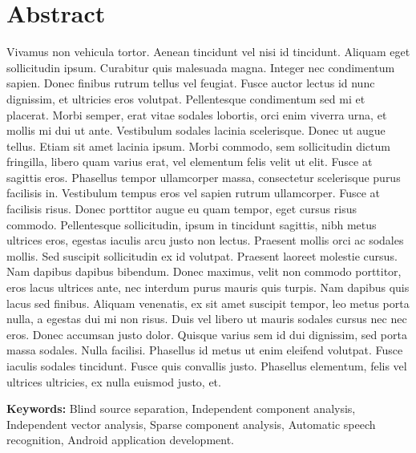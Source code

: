 
\chapter*{Abstract} 

Vivamus non vehicula tortor. Aenean tincidunt vel nisi id tincidunt. Aliquam eget sollicitudin ipsum. Curabitur quis malesuada magna. Integer nec condimentum sapien. Donec finibus rutrum tellus vel feugiat. Fusce auctor lectus id nunc dignissim, et ultricies eros volutpat. Pellentesque condimentum sed mi et placerat. Morbi semper, erat vitae sodales lobortis, orci enim viverra urna, et mollis mi dui ut ante. Vestibulum sodales lacinia scelerisque. Donec ut augue tellus. Etiam sit amet lacinia ipsum. Morbi commodo, sem sollicitudin dictum fringilla, libero quam varius erat, vel elementum felis velit ut elit. Fusce at sagittis eros. Phasellus tempor ullamcorper massa, consectetur scelerisque purus facilisis in. Vestibulum tempus eros vel sapien rutrum ullamcorper. Fusce at facilisis risus. Donec porttitor augue eu quam tempor, eget cursus risus commodo. Pellentesque sollicitudin, ipsum in tincidunt sagittis, nibh metus ultrices eros, egestas iaculis arcu justo non lectus. Praesent mollis orci ac sodales mollis. Sed suscipit sollicitudin ex id volutpat. Praesent laoreet molestie cursus. Nam dapibus dapibus bibendum. Donec maximus, velit non commodo porttitor, eros lacus ultrices ante, nec interdum purus mauris quis turpis. Nam dapibus quis lacus sed finibus. Aliquam venenatis, ex sit amet suscipit tempor, leo metus porta nulla, a egestas dui mi non risus. Duis vel libero ut mauris sodales cursus nec nec eros. Donec accumsan justo dolor. Quisque varius sem id dui dignissim, sed porta massa sodales. Nulla facilisi. Phasellus id metus ut enim eleifend volutpat. Fusce iaculis sodales tincidunt. Fusce quis convallis justo. Phasellus elementum, felis vel ultrices ultricies, ex nulla euismod justo, et.
\\
\par
\textbf{Keywords:} Blind source separation, Independent component analysis, Independent vector analysis, Sparse component analysis, Automatic speech recognition, Android application development.

